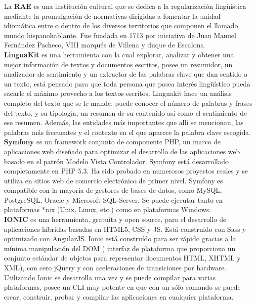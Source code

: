 \documentclass[a4paper,openright,11pt]{article}
\begin{document}
La \textbf{RAE} es una institución cultural que se dedica a la regularización lingüística mediante la promulgación de normativas dirigidas a fomentar la unidad idiomática entre o dentro de los diversos territorios que componen el llamado mundo hispanohablante. Fue fundada en 1713 por iniciativa de  Juan Manuel Fernández Pacheco, VIII marqués de Villena y duque de Escalona.\\

\textbf{LinguaKit} es una herramienta con la cual explorar, analizar y obtener una mejor información de textos y documentos escritos, posee un resumidor, un analizador de sentimiento y un extractor de las palabras clave que dan sentido a un texto, está pensado para que toda persona que posea interés lingüístico pueda sacarle el máximo provecho a los textos escritos. Linguakit hace un análisis completo del texto que se le mande, puede conocer el número de palabras y frases del texto, y su tipología, un resumen de su contenido así como el sentimiento de ese resumen. Además, las entidades más importantes que allí se mencionan, las palabras más frecuentes y el contexto en el que aparece la palabra clave escogida.\\

\textbf{Symfony} es un framework conjunto de componente PHP, un marco de aplicaciones web  diseñado para optimizar el desarrollo de las aplicaciones web basado en el patrón Modelo Vista Controlador. Symfony está desarrollado completamente en PHP 5.3. Ha sido probado en numerosos proyectos reales y se utiliza en sitios web de comercio electrónico de primer nivel. Symfony es compatible con la mayoría de gestores de bases de datos, como MySQL, PostgreSQL, Oracle y Microsoft SQL Server. Se puede ejecutar tanto en plataformas *nix (Unix, Linux, etc.) como en plataformas Windows.\\

\textbf{IONIC} es una herramienta, gratuita y open source, para el desarrollo de aplicaciones híbridas basadas en HTML5, CSS y JS. Está construido con Sass y optimizado con AngularJS. Ionic está construído para ser rápido gracias a la mínima manipulación del DOM ( interfaz de plataforma que proporciona un conjunto estándar de objetos para representar documentos HTML, XHTML y XML), con cero jQuery y con aceleraciones de transiciones por hardware. Utilizando Ionic se desarrolla una vez y se puede compilar para varias plataformas, posee un CLI muy potente en que con un sólo comando se puede crear, construir, probar y compilar las aplicaciones en cualquier plataforma.\\
\end{document}
